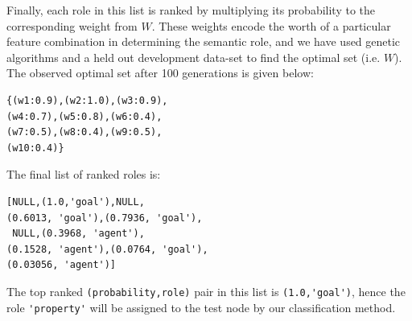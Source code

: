 \documentclass[11pt]{article}
\begin{document}
Finally, each role in this list is ranked by multiplying its probability to the corresponding weight from $W$. These weights encode the worth of a particular feature combination in determining the semantic role, and we have used genetic algorithms and a held out development data-set to find the optimal set (i.e. $W$). The observed optimal set after 100 generations is given below:
\begin{verbatim}
{(w1:0.9),(w2:1.0),(w3:0.9),
(w4:0.7),(w5:0.8),(w6:0.4),
(w7:0.5),(w8:0.4),(w9:0.5),
(w10:0.4)} 
\end{verbatim}
The final list of ranked roles is:
\begin{verbatim}
[NULL,(1.0,'goal'),NULL,
(0.6013, 'goal'),(0.7936, 'goal'),
 NULL,(0.3968, 'agent'),
(0.1528, 'agent'),(0.0764, 'goal'),
(0.03056, 'agent')]
\end{verbatim}
The top ranked \verb+(probability,role)+ pair in this list is \verb+(1.0,'goal')+, hence the role \verb+'property'+ will be assigned to the test node by our classification method.
\end{document}
